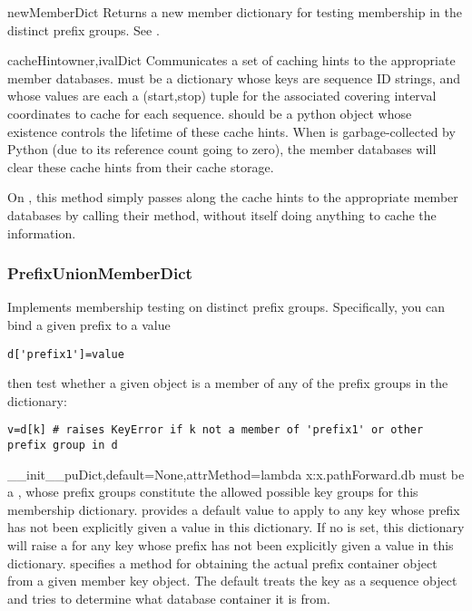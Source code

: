 \documentclass{howto}
\begin{document}
\begin{funcdesc}{newMemberDict}{}
  Returns a new member dictionary for testing membership in
  the distinct prefix groups.  See .
\end{funcdesc}

\begin{funcdesc}{cacheHint}{owner,ivalDict}
  Communicates a set of caching hints to the appropriate member
  databases.   must be a dictionary whose keys are
  sequence ID strings, and whose values are each a (start,stop) tuple
  for the associated covering interval coordinates to
  cache for each sequence.   should be a python object
  whose existence controls the lifetime of these cache hints.
  When  is garbage-collected by Python (due to its 
  reference count going to zero), the member databases will clear
  these cache hints from their cache storage.

  On , this method simply passes along
  the cache hints to the appropriate member databases by calling
  their  method, without itself doing anything
  to cache the information.
\end{funcdesc}



\subsubsection{PrefixUnionMemberDict}
Implements membership testing on distinct prefix groups.  Specifically,
you can bind a given prefix to a value
\begin{verbatim}
d['prefix1']=value
\end{verbatim}
then test whether a given object  is a member of any of the
prefix groups in the dictionary:
\begin{verbatim}
v=d[k] # raises KeyError if k not a member of 'prefix1' or other prefix group in d
\end{verbatim}

\begin{funcdesc}{__init__}{puDict,default=None,attrMethod=lambda x:x.pathForward.db}
   must be a , whose prefix groups constitute the
  allowed possible key groups for this membership dictionary.  
  provides a default value to apply to any key whose prefix has not been explicitly
  given a value in this dictionary.  If no  is set, this dictionary
  will raise a  for any key whose prefix has not been 
  explicitly given a value in this dictionary.
   specifies a method for obtaining
  the actual prefix container object from a given member key object.  The default
   treats the key as a sequence object and tries to determine what
  database container it is from.
\end{funcdesc}
\end{document}
